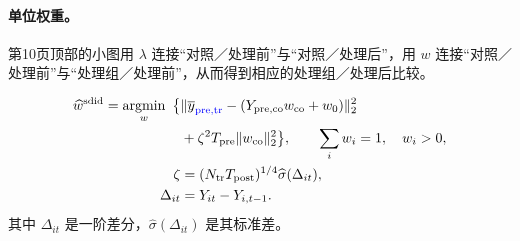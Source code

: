 \documentclass[11pt,a4paper]{article}
\begin{document}
\paragraph{单位权重。}
第10页顶部的小图用 \(\lambda\) 连接“对照／处理前”与“对照／处理后”，用 \(w\) 连接“对照／处理前”与“处理组／处理前”，从而得到相应的处理组／处理后比较。
\begin{center}
\end{center}
\begin{align*}
\widehat w^{\mathrm{sdid}}
=\operatorname*{argmin}_{w}\ \big\{
&\|\overline y_{\textcolor{blue}{\mathrm{pre,tr}}}
-(Y_{\mathrm{pre,co}}w_{\mathrm{co}}+w_0)\|_2^2\\
&+\zeta^2T_{\mathrm{pre}}\|w_{\mathrm{co}}\|_2^2\big\},
\qquad \sum_iw_i=1,\quad w_i>0,\\
\zeta&=(N_{\mathrm{tr}}T_{\mathrm{post}})^{1/4}
\widehat\sigma(\Delta_{it}),\\
\Delta_{it}&=Y_{it}-Y_{i,t-1}.
\end{align*}
其中 \(\Delta_{it}\) 是一阶差分，\(\widehat\sigma(\Delta_{it})\) 是其标准差。
\end{document}
